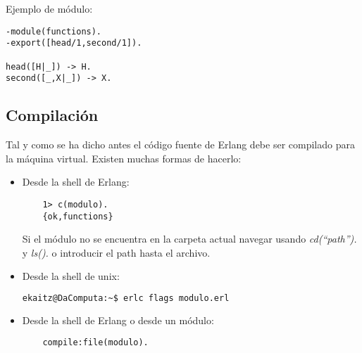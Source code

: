 Ejemplo de módulo:
\begin{lstlisting}
-module(functions).
-export([head/1,second/1]).

head([H|_]) -> H.
second([_,X|_]) -> X.
\end{lstlisting}

\subsection{Compilación}

Tal y como se ha dicho antes el código fuente de Erlang debe ser compilado para la máquina virtual. Existen
muchas formas de hacerlo:
\begin{itemize}
  \item Desde la shell de Erlang:
    \begin{lstlisting}
    1> c(modulo).
    {ok,functions}
    \end{lstlisting}
    Si el módulo no se encuentra en la carpeta actual navegar usando \textit{cd(``path'').} y \textit{ls().} o
    introducir el path hasta el archivo.

  \item Desde la shell de unix:
    \begin{lstlisting}[language=bash]
    ekaitz@DaComputa:~$ erlc flags modulo.erl
    \end{lstlisting}

  \item Desde la shell de Erlang o desde un módulo:
    \begin{lstlisting}
    compile:file(modulo).
    \end{lstlisting}
\end{itemize}




